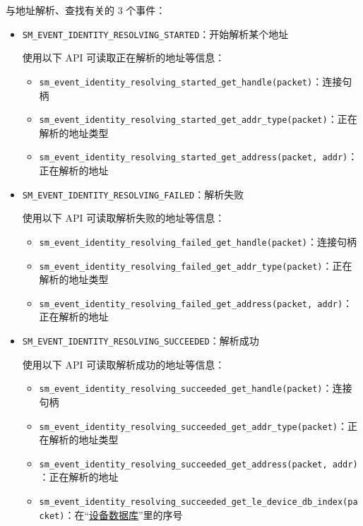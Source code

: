 \documentclass[
  12pt,
]{book}
\providecommand{\tightlist}{%
  \setlength{\itemsep}{0pt}\setlength{\parskip}{0pt}}
\begin{document}
与地址解析、查找有关的 3 个事件：

\begin{itemize}
\item
  \texttt{SM\_EVENT\_IDENTITY\_RESOLVING\_STARTED}：开始解析某个地址

  使用以下 API 可读取正在解析的地址等信息：

  \begin{itemize}
  \tightlist
  \item
    \texttt{sm\_event\_identity\_resolving\_started\_get\_handle(packet)}：连接句柄
  \item
    \texttt{sm\_event\_identity\_resolving\_started\_get\_addr\_type(packet)}：正在解析的地址类型
  \item
    \texttt{sm\_event\_identity\_resolving\_started\_get\_address(packet,\ addr)}：正在解析的地址
  \end{itemize}
\item
  \texttt{SM\_EVENT\_IDENTITY\_RESOLVING\_FAILED}：解析失败

  使用以下 API 可读取解析失败的地址等信息：

  \begin{itemize}
  \tightlist
  \item
    \texttt{sm\_event\_identity\_resolving\_failed\_get\_handle(packet)}：连接句柄
  \item
    \texttt{sm\_event\_identity\_resolving\_failed\_get\_addr\_type(packet)}：正在解析的地址类型
  \item
    \texttt{sm\_event\_identity\_resolving\_failed\_get\_address(packet,\ addr)}：正在解析的地址
  \end{itemize}
\item
  \texttt{SM\_EVENT\_IDENTITY\_RESOLVING\_SUCCEEDED}：解析成功

  使用以下 API 可读取解析成功的地址等信息：

  \begin{itemize}
  \tightlist
  \item
    \texttt{sm\_event\_identity\_resolving\_succeeded\_get\_handle(packet)}：连接句柄
  \item
    \texttt{sm\_event\_identity\_resolving\_succeeded\_get\_addr\_type(packet)}：正在解析的地址类型
  \item
    \texttt{sm\_event\_identity\_resolving\_succeeded\_get\_address(packet,\ addr)}：正在解析的地址
  \item
    \texttt{sm\_event\_identity\_resolving\_succeeded\_get\_le\_device\_db\_index(packet)}：在``\protect\hyperlink{ch98-le-dev-db}{设备数据库}''里的序号
  \end{itemize}


\end{itemize}
\end{document}
